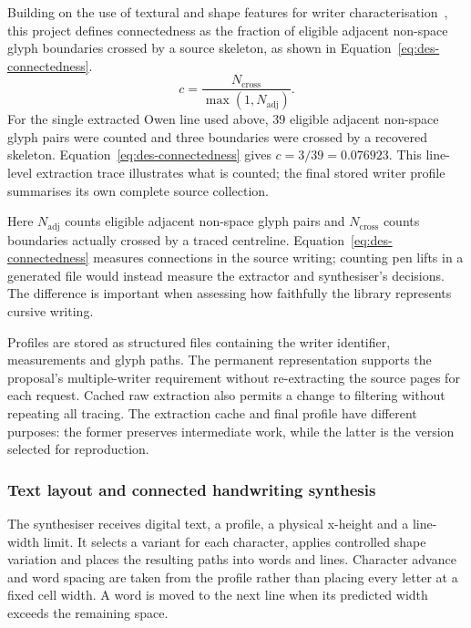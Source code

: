 Building on the use of textural and shape features for writer characterisation~\cite[p.~701]{bulacu2007}, this project defines connectedness as the fraction of eligible adjacent non-space glyph boundaries crossed by a source skeleton, as shown in Equation~\ref{eq:des-connectedness}.
\begin{equation}
c=\frac{N_{\mathrm{cross}}}{\max(1,N_{\mathrm{adj}})}.
\label{eq:des-connectedness}
\end{equation}
For the single extracted Owen line used above, 39 eligible adjacent non-space glyph pairs were counted and three boundaries were crossed by a recovered skeleton. Equation~\ref{eq:des-connectedness} gives $c=3/39=0.076923$. This line-level extraction trace illustrates what is counted; the final stored writer profile summarises its own complete source collection.

Here $N_{\mathrm{adj}}$ counts eligible adjacent non-space glyph pairs and $N_{\mathrm{cross}}$ counts boundaries actually crossed by a traced centreline. Equation~\ref{eq:des-connectedness} measures connections in the source writing; counting pen lifts in a generated file would instead measure the extractor and synthesiser's decisions. The difference is important when assessing how faithfully the library represents cursive writing.

Profiles are stored as structured files containing the writer identifier, measurements and glyph paths. The permanent representation supports the proposal's multiple-writer requirement without re-extracting the source pages for each request. Cached raw extraction also permits a change to filtering without repeating all tracing. The extraction cache and final profile have different purposes: the former preserves intermediate work, while the latter is the version selected for reproduction.

\subsubsection{Text layout and connected handwriting synthesis}
\label{sec:des-layout}
The synthesiser receives digital text, a profile, a physical x-height and a line-width limit. It selects a variant for each character, applies controlled shape variation and places the resulting paths into words and lines. Character advance and word spacing are taken from the profile rather than placing every letter at a fixed cell width. A word is moved to the next line when its predicted width exceeds the remaining space.

